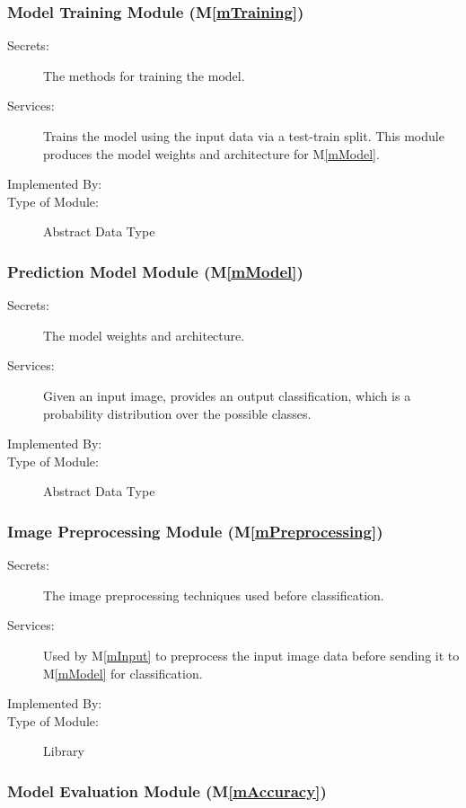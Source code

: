 \documentclass[12pt, titlepage]{article}
\newcommand{\mref}[1]{M\ref{#1}}
\begin{document}
\subsubsection{Model Training Module (\mref{mTraining})}

\begin{description}
\item[Secrets:] The methods for training the model.
\item[Services:] Trains the model using the input data via a test-train split.
This module produces the model weights and architecture for \mref{mModel}.
\item[Implemented By:] \progname{}
\item[Type of Module:] Abstract Data Type
\end{description}

\subsubsection{Prediction Model Module (\mref{mModel})}

\begin{description}
\item[Secrets:] The model weights and architecture.
\item[Services:] Given an input image, provides an output classification, which
is a probability distribution over the possible classes.
\item[Implemented By:] \progname{}
\item[Type of Module:] Abstract Data Type
\end{description}

\subsubsection{Image Preprocessing Module (\mref{mPreprocessing})}

\begin{description}
\item[Secrets:] The image preprocessing techniques used before classification.
\item[Services:] Used by \mref{mInput} to preprocess the input image data before
sending it to \mref{mModel} for classification.
\item[Implemented By:] \progname{}
\item[Type of Module:] Library
\end{description}

\subsubsection{Model Evaluation Module (\mref{mAccuracy})}
\end{document}
